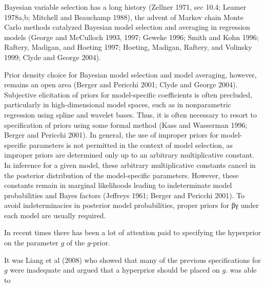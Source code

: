 \documentclass{article}[12pt]
\newcommand{\joc}[1]{{\color{red}#1}}
\begin{document}
\joc{ 
Bayesian variable selection has a long history (Zellner 1971, sec 10.4; Leamer 1978a,b; Mitchell and 
Beauchamp 1988), the advent of Markov chain Monte Carlo methods catalyzed Bayesian model selection and 
averaging in regression models (George and McCulloch 1993, 1997; Geweke 1996; Smith and Kohn 1996; 
Raftery, Madigan, and Hoeting 1997; Hoeting, Madigan, Raftery, and Volinsky 1999; Clyde and George 2004). 

Prior density choice for Bayesian model selection and model averaging, however, remains an open area
(Berger and Pericchi 2001; Clyde and George 2004). Subjective elicitation of priors for model-specific 
coefficients is often precluded, particularly in high-dimensional model spaces, such as in nonparametric 
regression using spline and wavelet bases. Thus, it is often necessary to resort to specification of
priors using some formal method (Kass and Wasserman 1996; Berger and Pericchi 2001). In general, the 
use of improper priors for model-specific parameters is not permitted in the context of model selection, 
as improper priors are determined only up to an arbitrary multiplicative constant. In inference for a 
given model, these arbitrary multiplicative constants cancel in the posterior distribution of the 
model-specific parameters. However, these constants remain in marginal likelihoods leading to 
indeterminate model probabilities and Bayes factors (Jeffreys 1961; Berger and Pericchi 2001). To avoid 
indeterminacies in posterior model probabilities, proper priors for βγ under each model are usually 
required.
}


In recent times there has been a lot of attention paid to specifying the hyperprior on
the parameter $g$ of the $g$-prior. 

It was Liang et al (2008) who showed that many of the previous specifications for $g$
were inadequate and argued that a hyperprior should be placed on $g$. \cite{Liang2008}
was able to 
\end{document}
